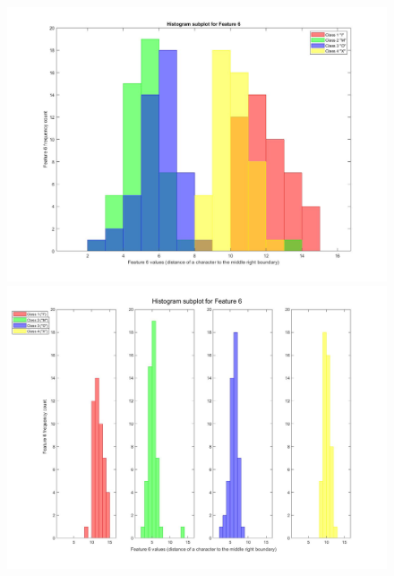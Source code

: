 \documentclass[a4paper,12pt]{article}
\begin{document}
\begin{figure}[H]
\centering
\includegraphics[scale=0.3]{q1pc_6.jpg}
\includegraphics[scale=0.3]{q1pcs_6.jpg}
\end{figure}
\pagebreak
\end{document}
